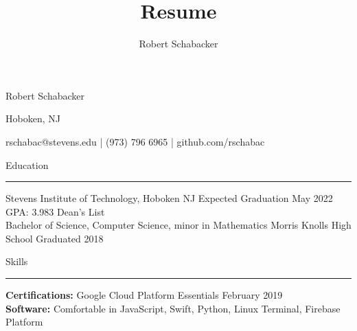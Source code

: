 \documentclass{article}
\title{Resume}
\author{Robert Schabacker}
\newcommand \spacingBetweenHeadings {0.5em}
\begin{document}
\begin{center}
{\Huge Robert Schabacker\par}
{\Large Hoboken, NJ\par}
{\Large rschabac@stevens.edu  |  (973) 796 6965  |  github.com/rschabac\par}
\end{center}
\vspace{0.7em}
\vspace{\spacingBetweenHeadings}

\noindent
\huge Education\par
\vspace{0.1em}
\hrule
\Large
\vspace{1em}
\noindent
Stevens Institute of Technology, Hoboken NJ
\hfill
Expected Graduation May 2022\\
GPA: 3.983 \hspace{0.7cm} Dean's List\\
Bachelor of Science, Computer Science, minor in Mathematics
\vspace{1em}
\newline
Morris Knolls High School
\hfill
Graduated 2018
\vspace{\spacingBetweenHeadings}

\noindent
\huge Skills\par
\vspace{0.1em}
\hrule
\Large
\vspace{1em}
\noindent
\textbf{Certifications:} Google Cloud Platform Essentials
\hfill
February 2019\\
\textbf{Software:} Comfortable in JavaScript, Swift, Python, Linux Terminal, Firebase Platform
\vspace{\spacingBetweenHeadings}
\end{document}
